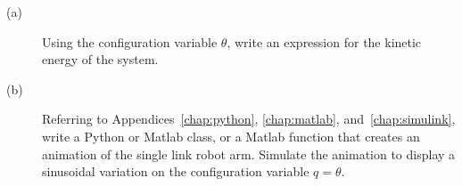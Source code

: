 \begin{description}
\item[(a)]	Using the configuration variable $\theta$, write an expression for the kinetic energy of the system.
\item[(b)]  Referring to Appendices~\ref{chap:python}, \ref{chap:matlab}, and~\ref{chap:simulink}, write a Python or Matlab class, or a Matlab function that creates an animation of the single link robot arm.  Simulate the animation to display a sinusoidal variation on the configuration variable $q=\theta$. 
\end{description}


